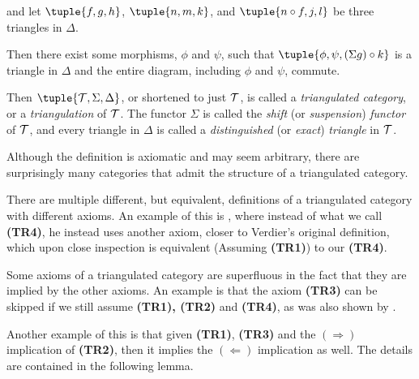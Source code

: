 \begin{definition}
\begin{enumerate}[label={(\bfseries TR\arabic*)}]
{\begin{center}
            \end{center}
            and let \( \tuple{f, g, h} \), \( \tuple{n, m, k} \), and \( \tuple{n \circ f, j, l} \) be three triangles in \( \Delta \).

            Then there exist some morphisms, \( \phi \) and \( \psi \), such that \( \tuple{\phi, \psi, (\Sigma g) \circ k} \) is a triangle in \( \Delta \) and the entire diagram, including \( \phi \) and \( \psi \), commute.
        }
    \end{enumerate}

    Then \( \tuple{ \Tc, \Sigma, \Delta } \), or shortened to just \( {\mathcal{T}} \), is called a \emph{triangulated category}, or a \emph{triangulation} of \( {\mathcal{T}} \). The functor \( \Sigma \) is called the \emph{shift} (or \emph{suspension}) \emph{functor} of \( {\mathcal{T}} \), and every triangle in \( \Delta \) is called a \emph{distinguished} (or \emph{exact}) \emph{triangle} in \( {\mathcal{T}} \). 
\end{definition}


Although the definition is axiomatic and may seem arbitrary, there are surprisingly many categories that admit the structure of a triangulated category.

There are multiple different, but equivalent, definitions of a triangulated category with different axioms. An example of this is \cite[Definition 2.1]{May_2001}, where instead of what we call {\bf (TR4)}, he instead uses another axiom, closer to Verdier's original definition, which upon close inspection is equivalent (Assuming {\bf (TR1)}) to our {\bf (TR4)}.

Some axioms of a triangulated category are superfluous in the fact that they are implied by the other axioms. An example is that the axiom {\bf (TR3)} can be skipped if we still assume {\bf (TR1), (TR2)} and {\bf (TR4)}, as was also shown by \cite[Lemma 2.2]{May_2001}.

Another example of this is that given {\bf (TR1)}, {\bf (TR3)} and the \( (\Rightarrow) \) implication of {\bf (TR2)}, then it implies the \( (\Leftarrow) \) implication as well. The details are contained in the following lemma.

